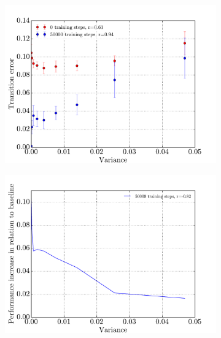 \begin{figure}[p]
\begin{subfigure}{0.48\textwidth}
        \includegraphics[width=\textwidth]{results/mc2_correlation_inequality_variance_train}
        \caption{}
        \label{fig:mc2-variance}
    \end{subfigure}
    \hfill
    \begin{subfigure}{0.48\textwidth}
    	\centering
        \includegraphics[width=\textwidth]{results/mc2_correlation_inequality_variance_train_baseline}
        \caption{}
        \label{fig:mc2-variance-baseline}
    \end{subfigure}

\end{figure}
